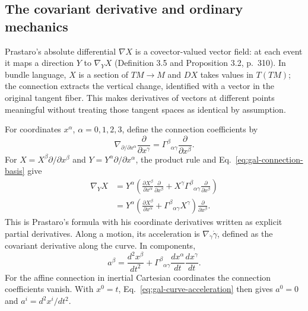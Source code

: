 \subsection{The covariant derivative and ordinary mechanics}

Prastaro's absolute differential $\nabla X$ is a covector-valued vector
field: at each event it maps a direction $Y$ to $\nabla_YX$ (Definition 3.5
and Proposition 3.2, p.~310).  In bundle language, $X$ is a
section of $TM\to M$ and $DX$ takes values in $T(TM)$; the connection
extracts the vertical change, identified with a vector in the original
tangent fiber.  This makes derivatives of vectors at different points
meaningful without treating those tangent spaces as identical by assumption.

For coordinates $x^\alpha$, $\alpha=0,1,2,3$, define the connection
coefficients by
\begin{equation}\label{eq:gal-connection-basis}
 \nabla_{\partial/\partial x^\alpha}
 \frac{\partial}{\partial x^\gamma}
 =\Gamma^\beta{}_{\alpha\gamma}
 \frac{\partial}{\partial x^\beta}.
\end{equation}
For $X=X^\beta\partial/\partial x^\beta$ and
$Y=Y^\alpha\partial/\partial x^\alpha$, the product rule and
Eq.~\eqref{eq:gal-connection-basis} give
\begin{align}\label{eq:gal-covariant-coordinate}
 \nabla_YX
 &=Y^\alpha\left(
 \frac{\partial X^\beta}{\partial x^\alpha}
 \frac{\partial}{\partial x^\beta}
 +X^\gamma\Gamma^\beta{}_{\alpha\gamma}
 \frac{\partial}{\partial x^\beta}\right)\\
 &=Y^\alpha\left(
 \frac{\partial X^\beta}{\partial x^\alpha}
 +\Gamma^\beta{}_{\alpha\gamma}X^\gamma\right)
 \frac{\partial}{\partial x^\beta}.\nonumber
\end{align}
This is Prastaro's formula with his coordinate derivatives written as
explicit partial derivatives.  Along a motion, its acceleration is
$\nabla_{\dot\gamma}\dot\gamma$, defined as the covariant derivative along
the curve.  In components,
\begin{equation}\label{eq:gal-curve-acceleration}
 a^\beta=\frac{d^2x^\beta}{dt^2}
 +\Gamma^\beta{}_{\alpha\gamma}
 \frac{dx^\alpha}{dt}\frac{dx^\gamma}{dt}.
\end{equation}
For the affine connection in inertial Cartesian coordinates the connection
coefficients vanish.  With $x^0=t$, Eq.~\eqref{eq:gal-curve-acceleration}
then gives $a^0=0$ and $a^i=d^2x^i/dt^2$.

